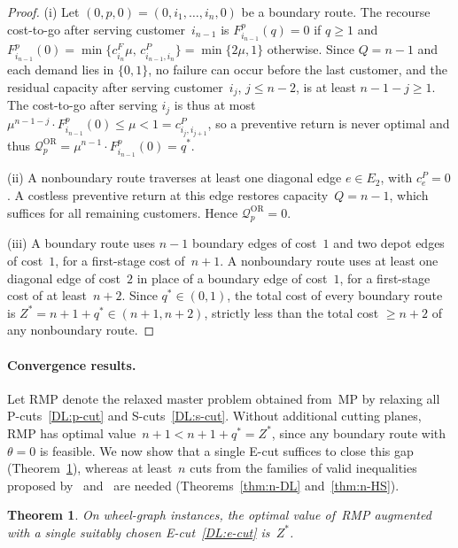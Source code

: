 \documentclass{article}
\newtheorem{theorem}{Theorem}
\begin{document}
{\begin{proof}
(i) Let $(0,p,0)=(0,i_1,\dots,i_n,0)$ be a boundary route. The recourse cost-to-go after serving customer~$i_{n-1}$ is $F_{i_{n-1}}^{p}(q)=0$ if $q \geq 1$ and $F_{i_{n-1}}^{p}(0) = \min\{c^F_{i_n}\mu,\, c^P_{i_{n-1},i_n}\} = \min\{2\mu, 1\}$ otherwise. Since $Q=n-1$ and each demand lies in $\{0,1\}$, no failure can occur before the last customer, and the residual capacity after serving customer~$i_j$, $j \leq n-2$, is at least $n-1-j \geq 1$. The cost-to-go after serving $i_j$ is thus at most $\mu^{n-1-j}\cdot F_{i_{n-1}}^{p}(0) \leq \mu < 1 = c^P_{i_j,i_{j+1}}$, so a preventive return is never optimal and thus $\mathcal{Q}^{\text{OR}}_{p} = \mu^{n-1} \cdot F_{i_{n-1}}^{p}(0) = q^*$.

(ii) A nonboundary route traverses at least one diagonal edge $e \in E_2$, with $c^P_e = 0$. A costless preventive return at this edge restores capacity~$Q = n-1$, which suffices for all remaining customers. Hence $\mathcal{Q}^{\text{OR}}_p = 0$.

(iii) A boundary route uses $n-1$ boundary edges of cost~$1$ and two depot edges of cost~$1$, for a first-stage cost of~$n+1$. A nonboundary route uses at least one diagonal edge of cost~$2$ in place of a boundary edge of cost~$1$, for a first-stage cost of at least~$n+2$. Since $q^* \in (0,1)$, the total cost of every boundary route is $Z^* = n+1+q^* \in (n+1,n+2)$, strictly less than the total cost $\geq n+2$ of any nonboundary route.
\end{proof}

\paragraph{Convergence results.} Let RMP denote the relaxed master problem obtained from~MP by relaxing all P-cuts~\eqref{DL:p-cut} and S-cuts~\eqref{DL:s-cut}. Without additional cutting planes, RMP has optimal value~$n+1 < n+1+q^* = Z^*$, since any boundary route with $\theta = 0$ is feasible. We now show that a single E-cut suffices to close this gap (Theorem~\ref{thm:one-ecut}), whereas at least~$n$ cuts from the families of valid inequalities proposed by~\cite{parada2024disaggregated} and~\cite{hoogendoorn2023improved} are needed (Theorems~\ref{thm:n-DL} and~\ref{thm:n-HS}).

\begin{theorem}\label{thm:one-ecut}
On wheel-graph instances, the optimal value of~RMP augmented with a single suitably chosen E-cut~\eqref{DL:e-cut} is~$Z^*$.
\end{theorem}

}
\end{document}
